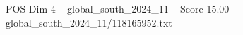 \begin{textsample}{POS Dim 4 – global\_south\_2024\_11 – Score 15.00 – global\_south\_2024\_11/118165952.txt}
\end{textsample}
